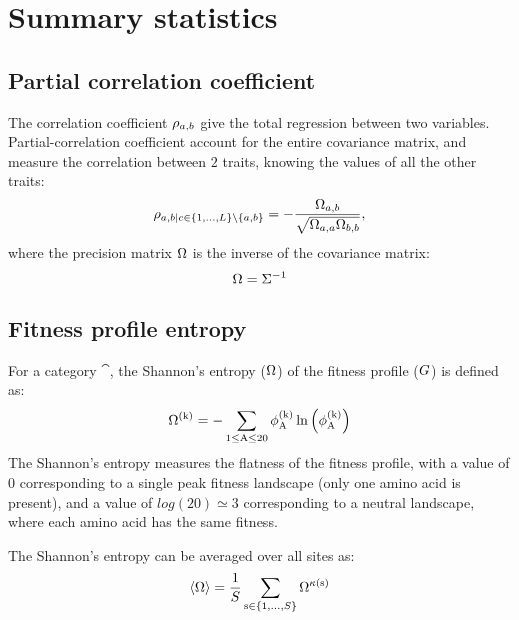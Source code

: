 \section{Summary statistics}
\label{sec:summary-statistics}

\subsection{Partial correlation coefficient}
\label{subsec:partial-correlation-coefficient}

The correlation coefficient $\rho_{a, b}$ give the total regression between two variables.
Partial-correlation coefficient account for the entire covariance matrix, and measure the correlation between $2$ traits, knowing the values of all the other traits:
\begin{equation}
    \rho_{a, b | c \in \{1, \hdots, L\} \setminus \{ a, b\} } = - \dfrac{\Omega_{a, b}}{\sqrt{\Omega_{a, a} \Omega_{b, b}}},
\end{equation}
where the precision matrix $\Omega$ is the inverse of the covariance matrix:
\begin{equation}
    \Omega = \Sigma^{-1}
\end{equation}

\subsection{Fitness profile entropy}
\label{subsec:fitness-profile-entropy}

For a category $\cat$, the Shannon's entropy (${\Omega}$) of the fitness profile ($G$) is defined as:
\begin{equation}
    {\Omega}^{(\text{k})} = - \sum\limits_{1 \leq \text{A} \leq 20} \phi^{(\text{k})}_{\text{A}} \ln \left( \phi^{(\text{k})}_{\text{A}} \right)
\end{equation}
The Shannon's entropy measures the flatness of the fitness profile, with a value of $0$ corresponding to a single peak fitness landscape (only one amino acid is present), and a value of $log(20)\simeq3$ corresponding to a neutral landscape, where each amino acid has the same fitness.

The Shannon's entropy can be averaged over all sites as:
\begin{equation}
    \left\langle {\Omega} \right\rangle = \dfrac{1}{S}\sum\limits_{\text{s} \in \{1, \hdots, S\}} {\Omega}^{\kappa\left(\text{s}\right)}
\end{equation}


